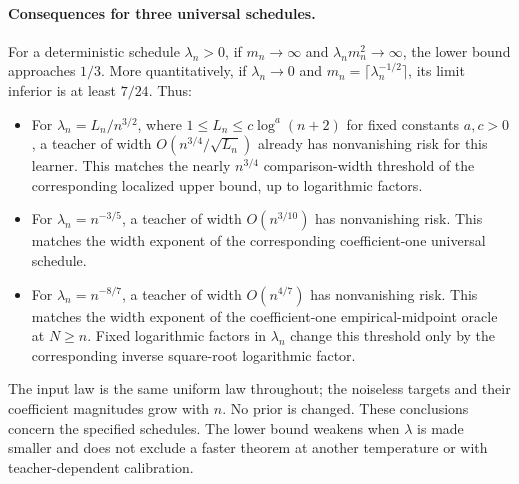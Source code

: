 \paragraph{Consequences for three universal schedules.}
For a deterministic schedule $\lambda_n>0$, if $m_n\to\infty$
and $\lambda_nm_n^2\to\infty$, the lower bound approaches $1/3$.
More quantitatively, if $\lambda_n\to0$ and
$m_n=\lceil\lambda_n^{-1/2}\rceil$, its limit inferior is at least
$7/24$. Thus:
\begin{itemize}
\item For $\lambda_n=L_n/n^{3/2}$, where $1\le L_n\le
c\log^a(n+2)$ for fixed constants $a,c>0$, a teacher of width
$O(n^{3/4}/\sqrt{L_n})$ already has nonvanishing risk for this learner.
This matches the nearly $n^{3/4}$ comparison-width threshold of
the corresponding localized upper bound, up to logarithmic factors.
\item For $\lambda_n=n^{-3/5}$, a teacher of width $O(n^{3/10})$
has nonvanishing risk. This matches the width exponent of the
corresponding coefficient-one universal schedule.
\item For $\lambda_n=n^{-8/7}$, a teacher of width $O(n^{4/7})$
has nonvanishing risk. This matches the width exponent of the
coefficient-one empirical-midpoint oracle at $N\ge n$.
Fixed logarithmic factors in $\lambda_n$ change this threshold
only by the corresponding inverse square-root logarithmic factor.
\end{itemize}
The input law is the same uniform law throughout; the noiseless
targets and their coefficient magnitudes grow with $n$. No prior
is changed. These conclusions concern the specified schedules.
The lower bound weakens when $\lambda$ is made smaller and does
not exclude a faster theorem at another temperature or with
teacher-dependent calibration.
